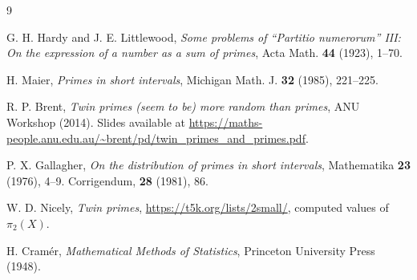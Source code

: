 \documentclass[11pt]{article}
\begin{document}
\begin{thebibliography}{9}

G. H. Hardy and J. E. Littlewood,
\textit{Some problems of ``Partitio numerorum'' III: On the expression of a number as a sum of primes},
Acta Math. \textbf{44} (1923), 1--70.

H. Maier,
\textit{Primes in short intervals},
Michigan Math. J. \textbf{32} (1985), 221--225.

R. P. Brent,
\textit{Twin primes (seem to be) more random than primes},
ANU Workshop (2014). Slides available at \url{https://maths-people.anu.edu.au/~brent/pd/twin_primes_and_primes.pdf}.

P. X. Gallagher,
\textit{On the distribution of primes in short intervals},
Mathematika \textbf{23} (1976), 4--9. Corrigendum, \textbf{28} (1981), 86.

W. D. Nicely,
\textit{Twin primes},
\url{https://t5k.org/lists/2small/}, computed values of $\pi_2(X)$.

H. Cram\'{e}r,
\textit{Mathematical Methods of Statistics},
Princeton University Press (1948).

\end{thebibliography}
\end{document}
